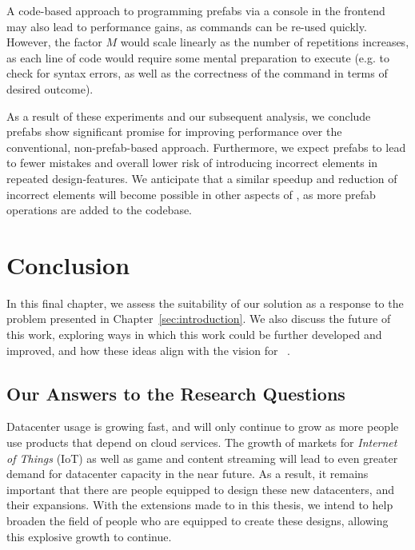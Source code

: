 \documentclass[11pt]{article}
\begin{document}
			A code-based approach to programming prefabs via a console in the frontend may also lead to performance gains, as commands can be re-used quickly.
			However, the factor $M$ would scale linearly as the number of repetitions increases, as each line of code would require some mental preparation to execute (e.g. to check for syntax errors, as well as the correctness of the command in terms of desired outcome).

			As a result of these experiments and our subsequent analysis, we conclude prefabs show significant promise for improving performance over the conventional, non-prefab-based approach. 
			Furthermore, we expect prefabs to lead to fewer mistakes and overall lower risk of introducing incorrect elements in repeated design-features. 
			We anticipate that a similar speedup and reduction of incorrect elements will become possible in other aspects of \opendc{}, as more prefab operations are added to the \opendc{} codebase.

\newpage

\section{Conclusion} \label{sec:conclusion}
	In this final chapter, we assess the suitability of our solution as a response to the problem presented in Chapter~\ref{sec:introduction}.
	We also discuss the future of this work, exploring ways in which this work could be further developed and improved, and how these ideas align with the vision for \opendc{}~\cite{Iosup2017}.

	\subsection{Our Answers to the Research Questions}
		Datacenter usage is growing fast, and will only continue to grow as more people use products that depend on cloud services.
		The growth of markets for \textit{Internet of Things} (IoT) as well as game and content streaming will lead to even greater demand for datacenter capacity in the near future.
		As a result, it remains important that there are people equipped to design these new datacenters, and their expansions.
		With the extensions made to \opendc{} in this thesis, we intend to help broaden the field of people who are equipped to create these designs, allowing this explosive growth to continue.
\end{document}
